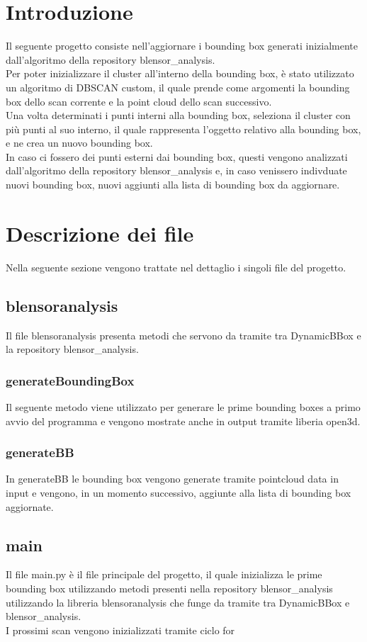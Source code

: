 \documentclass[italian]{article}
\begin{document}
\section{Introduzione}
Il seguente progetto consiste nell'aggiornare i bounding box generati inizialmente dall'algoritmo della repository blensor\_analysis.\\
Per poter inizializzare il cluster all'interno della bounding box, è stato utilizzato un algoritmo di DBSCAN custom, il quale prende come argomenti la bounding box dello scan corrente e la point cloud dello scan successivo.\\
Una volta determinati i punti interni alla bounding box, seleziona il cluster con più punti al suo interno, il quale rappresenta l'oggetto relativo alla bounding box, e ne crea un nuovo bounding box.\\
In caso ci fossero dei punti esterni dai bounding box, questi vengono analizzati dall'algoritmo della repository blensor\_analysis e, in caso venissero indivduate nuovi bounding box, nuovi aggiunti alla lista di bounding box da aggiornare.\\
\section{Descrizione dei file}
Nella seguente sezione vengono trattate nel dettaglio i singoli file del progetto.
\subsection{blensoranalysis}
Il file blensoranalysis presenta metodi che servono da tramite tra DynamicBBox e la repository blensor\_analysis.
\subsubsection{generateBoundingBox}
Il seguente metodo viene utilizzato per generare le prime bounding boxes a primo avvio del programma e vengono mostrate anche in output tramite liberia open3d.
\subsubsection{generateBB}
In generateBB le bounding box vengono generate tramite pointcloud data in input e vengono, in un momento successivo, aggiunte alla lista di bounding box aggiornate.
\subsection{main}
Il file main.py è il file principale del progetto, il quale inizializza le prime bounding box utilizzando metodi presenti nella repository blensor\_analysis utilizzando la libreria blensoranalysis che funge da tramite tra DynamicBBox e blensor\_analysis.\\
I prossimi scan vengono inizializzati tramite ciclo for
\end{document}
